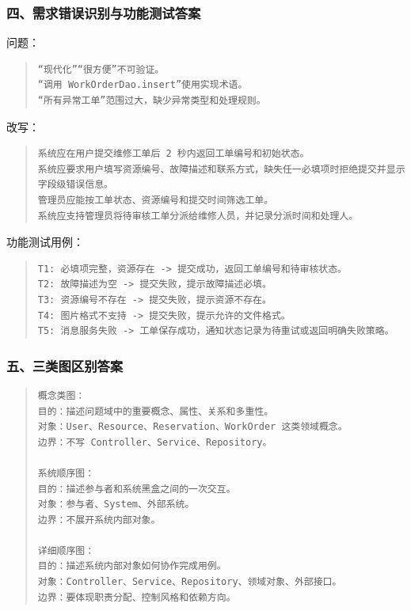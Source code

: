 \documentclass[UTF8,zihao=-4]{ctexart}
\begin{document}
\subsubsection*{四、需求错误识别与功能测试答案}


问题：


\begin{quote}
\footnotesize
\begin{verbatim}
“现代化”“很方便”不可验证。
“调用 WorkOrderDao.insert”使用实现术语。
“所有异常工单”范围过大，缺少异常类型和处理规则。
\end{verbatim}
\end{quote}


改写：


\begin{quote}
\footnotesize
\begin{verbatim}
系统应在用户提交维修工单后 2 秒内返回工单编号和初始状态。
系统应要求用户填写资源编号、故障描述和联系方式，缺失任一必填项时拒绝提交并显示字段级错误信息。
管理员应能按工单状态、资源编号和提交时间筛选工单。
系统应支持管理员将待审核工单分派给维修人员，并记录分派时间和处理人。
\end{verbatim}
\end{quote}


功能测试用例：


\begin{quote}
\footnotesize
\begin{verbatim}
T1: 必填项完整，资源存在 -> 提交成功，返回工单编号和待审核状态。
T2: 故障描述为空 -> 提交失败，提示故障描述必填。
T3: 资源编号不存在 -> 提交失败，提示资源不存在。
T4: 图片格式不支持 -> 提交失败，提示允许的文件格式。
T5: 消息服务失败 -> 工单保存成功，通知状态记录为待重试或返回明确失败策略。
\end{verbatim}
\end{quote}


\subsubsection*{五、三类图区别答案}


\begin{quote}
\footnotesize
\begin{verbatim}
概念类图：
目的：描述问题域中的重要概念、属性、关系和多重性。
对象：User、Resource、Reservation、WorkOrder 这类领域概念。
边界：不写 Controller、Service、Repository。

系统顺序图：
目的：描述参与者和系统黑盒之间的一次交互。
对象：参与者、System、外部系统。
边界：不展开系统内部对象。

详细顺序图：
目的：描述系统内部对象如何协作完成用例。
对象：Controller、Service、Repository、领域对象、外部接口。
边界：要体现职责分配、控制风格和依赖方向。
\end{verbatim}
\end{quote}
\end{document}

